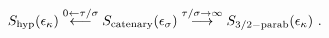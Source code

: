 \begin{equation} 
S_{\rm hyp}(\epsilon _{\kappa}) 
\stackrel{0\leftarrow \tau/\sigma}{\longleftarrow} 
S_{\rm catenary}(\epsilon _{\sigma})\stackrel{\tau/\sigma\rightarrow \infty} 
{\longrightarrow}S_{\rm 3/2-parab}(\epsilon _{\kappa})~. 
\end{equation} 
